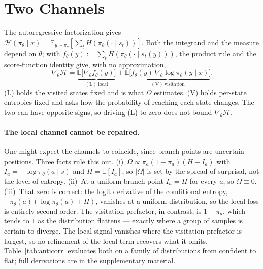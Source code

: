 \documentclass[runningheads]{llncs}
\newcommand{\Htraj}{\mathcal{H}}
\newcommand{\Om}{\Omega}
\newcommand{\E}{\mathbb{E}}
\newcommand{\gradt}{\nabla_{\theta}}
\newcommand{\pit}{\pi_{\theta}}
\begin{document}
\section{Two Channels}
\label{sec:channels}

The autoregressive factorization gives $\Htraj(\pit \mid x) = \E_{y \sim
\pit}[\sum_t H(\pit(\cdot \mid s_t))]$. Both the integrand and the measure depend on
$\theta$; with $f_\theta(y) := \sum_t H(\pit(\cdot \mid s_t(y)))$, the product rule and
the score-function identity give, with no approximation,
\begin{equation}
\gradt \Htraj
= \underbrace{\E\bigl[\gradt f_\theta(y)\bigr]}_{(\mathrm{L})\ \text{local}}
+ \underbrace{\E\bigl[f_\theta(y)\,\gradt \log \pit(y \mid x)\bigr]}_{(\mathrm{V})\ \text{visitation}}.
\label{eq:twochannel}
\end{equation}
(L) holds the visited states fixed and is what $\Om$ estimates. (V) holds per-state
entropies fixed and asks how the probability of reaching each state changes. The two can
have opposite signs, so driving (L) to zero does not bound $\gradt \Htraj$.

\paragraph{The local channel cannot be repaired.} One might expect the channels to
coincide, since branch points are uncertain positions. Three facts rule this out.
(i)~$\Om \propto \pi_a(1-\pi_a)(H - I_a)$ with $I_a = -\log \pit(a \mid s)$ and
$H = \E[I_a]$, so $|\Om|$ is set by the spread of surprisal, not the level of entropy.
(ii)~At a uniform branch point $I_a = H$ for every $a$, so $\Om \equiv 0$.
(iii)~That zero is correct: the logit derivative of the conditional entropy,
$-\pit(a)(\log \pit(a) + H)$, vanishes at a uniform distribution, so the local loss is
entirely second order. The visitation prefactor, in contrast, is $1 - \pi_a$, which
tends to $1$ as the distribution flattens --- exactly where a group of samples is
certain to diverge. The local signal vanishes where the visitation prefactor is largest,
so no refinement of the local term recovers what it omits. Table~\ref{tab:anticorr}
evaluates both on a family of distributions from confident to flat; full derivations
are in the supplementary material.
\end{document}
